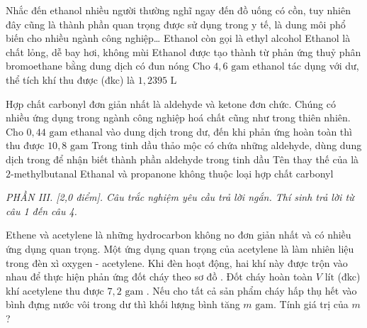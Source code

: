 \documentclass[12pt,a4paper]{article}
\begin{document}
\begin{ex}
Nhắc đến ethanol nhiều người thường nghĩ ngay đến đồ uống có cồn, tuy nhiên đây cũng là thành phần quan trọng được sử dụng trong y tế, là dung môi phổ biến cho nhiều ngành công nghiệp\dots
\choiceTF
{\True Ethanol còn gọi là ethyl alcohol}
{Ethanol là chất lỏng, dễ bay hơi, không mùi}
{\True Ethanol được tạo thành từ phản ứng thuỷ phân bromoethane bằng dung dịch  có đun nóng}
{\True Cho $4{,}6\text{ gam}$ ethanol tác dụng với  dư, thể tích khí  thu được (đkc) là $1{,}2395\text{ L}$}
\loigiai{}
\end{ex}

\begin{ex}
Hợp chất carbonyl đơn giản nhất là aldehyde và ketone đơn chức. Chúng có nhiều ứng dụng trong ngành công nghiệp hoá chất cũng như trong thiên nhiên.
\choiceTF
{Cho $0{,}44\text{ gam}$ ethanal vào dung dịch  trong  dư, đến khi phản ứng hoàn toàn thì thu được $10{,}8\text{ gam}$ }
{\True Trong tinh dầu thảo mộc có chứa những aldehyde, dùng dung dịch  trong  để nhận biết thành phần aldehyde trong tinh dầu}
{Tên thay thế của  là $2$-methylbutanal}
{Ethanal và propanone không thuộc loại hợp chất carbonyl}
\loigiai{}
\end{ex}

\begin{flushleft}
	{\color{blue!50!green}}
\end{flushleft}
\setcounter{ex}{0}
\setcounter{bt}{0}

\textit{PHẦN III. [2,0 điểm]. Câu trắc nghiệm yêu cầu trả lời ngắn. Thí sinh trả lời từ câu 1 đến câu 4.}

\begin{ex}
Ethene và acetylene là những hydrocarbon không no đơn giản nhất và có nhiều ứng dụng quan trọng. Một ứng dụng quan trọng của acetylene là làm nhiên liệu trong đèn xì oxygen - acetylene. Khi đèn hoạt động, hai khí này được trộn vào nhau để thực hiện phản ứng đốt cháy theo sơ đồ . Đốt cháy hoàn toàn $V\text{ lít}$ (đkc) khí acetylene thu được $7{,}2\text{ gam}$ . Nếu cho tất cả sản phẩm cháy hấp thụ hết vào bình đựng nước vôi trong dư thì khối lượng bình tăng $m\text{ gam}$. Tính giá trị của $m$?
\par{}
\loigiai{}
\end{ex}
\end{document}
